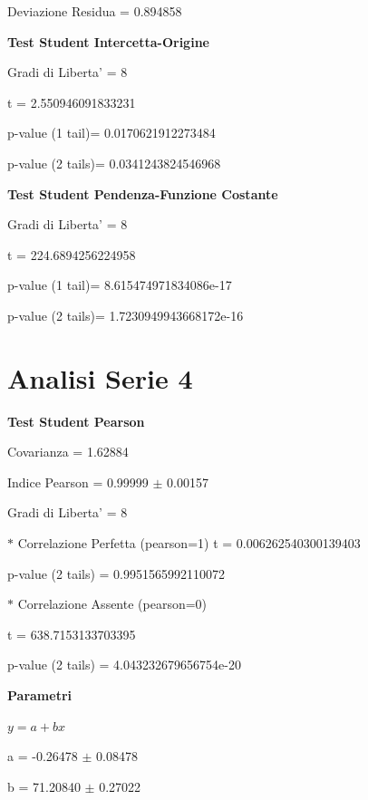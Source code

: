 \documentclass{article}
\begin{document}
Deviazione Residua = 0.894858

\textbf{Test Student Intercetta-Origine}

Gradi di Liberta' = 8

t = 2.550946091833231

p-value (1 tail)= 0.0170621912273484

p-value (2 tails)= 0.0341243824546968

\textbf{Test Student Pendenza-Funzione Costante}

Gradi di Liberta' = 8

t = 224.6894256224958

p-value (1 tail)= 8.615474971834086e-17

p-value (2 tails)= 1.7230949943668172e-16

\section*{Analisi Serie 4}

\textbf{Test Student Pearson}

Covarianza = 1.62884

Indice Pearson = 0.99999 $\pm$ 0.00157

Gradi di Liberta' = 8

$\ast$ Correlazione Perfetta (pearson=1)
t = 0.006262540300139403

p-value (2 tails) = 0.9951565992110072

$\ast$ Correlazione Assente (pearson=0)

t = 638.7153133703395

p-value (2 tails) = 4.043232679656754e-20

\textbf{Parametri}

$y = a + bx$

a = -0.26478 $\pm$ 0.08478

b = 71.20840 $\pm$ 0.27022
\end{document}

